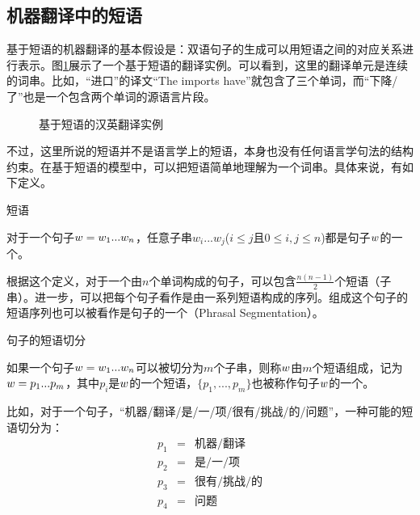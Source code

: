 \subsection{机器翻译中的短语}

\parinterval 基于短语的机器翻译的基本假设是：双语句子的生成可以用短语之间的对应关系进行表示。图\ref{fig:7-9}展示了一个基于短语的翻译实例。可以看到，这里的翻译单元是连续的词串。比如，“进口”的译文“The imports have”就包含了三个单词，而“下降/了”也是一个包含两个单词的源语言片段。

\begin{figure}[htp]
\centering

\caption{基于短语的汉英翻译实例}
\label{fig:7-9}
\end{figure}

\parinterval 不过，这里所说的短语并不是语言学上的短语，本身也没有任何语言学句法的结构约束。在基于短语的模型中，可以把短语简单地理解为一个词串。具体来说，有如下定义。

\vspace{0.5em}
\begin{definition} 短语

{\small
对于一个句子${w} = w_1...w_n$，任意子串$w_i...w_j$($i\leq j$且$0\leq i,j\leq n$)都是句子${w}$的一个{\small{}}。
}
\end{definition}

\parinterval 根据这个定义，对于一个由$n$个单词构成的句子，可以包含$\frac{n(n-1)}{2}$个短语（子串）。进一步，可以把每个句子看作是由一系列短语构成的序列。组成这个句子的短语序列也可以被看作是句子的一个{\small{}}（Phrasal Segmentation）。

\vspace{0.5em}
\begin{definition} 句子的短语切分

{\small
如果一个句子${w} = w_1...w_n$可以被切分为$m$个子串，则称${w}$由$m$个短语组成，记为${w} = p_1...p_m$，其中$p_i$是${w}$的一个短语，$\{p_1,...,p_m\}$也被称作句子${w}$的一个{\small{}}。
}
\end{definition}

\parinterval 比如，对于一个句子，“机器/翻译/是/一/项/很有/挑战/的/问题”，一种可能的短语切分为：
\begin{eqnarray}
p_1 &=& \text{机器}/\text{翻译} \nonumber \\
p_2 &=& \text{是}/\text{一}/\text{项} \nonumber \\
p_3 &=& \text{很有}/\text{挑战}/\text{的} \nonumber \\
p_4 &=& \text{问题}\nonumber
\end{eqnarray}


